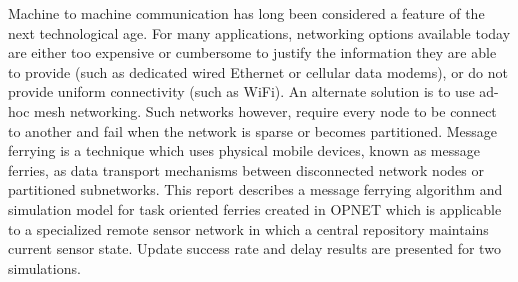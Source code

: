 Machine to machine communication has long been considered a feature of the next technological age. 
For many applications, networking options available today are either too expensive or cumbersome to justify the information they are able to provide (such as dedicated wired Ethernet or cellular data modems), or do not provide uniform connectivity (such as WiFi). 
An alternate solution is to use ad-hoc mesh networking. 
Such networks however, require every node to be connect to another and fail when the network is sparse or becomes partitioned.
Message ferrying is a technique which uses physical mobile devices, known as message ferries, as data transport mechanisms between disconnected network nodes or partitioned subnetworks.
This report describes a message ferrying algorithm and simulation model for task oriented ferries created in OPNET which is applicable to a specialized remote sensor network in which a central repository maintains current sensor state.
Update success rate and delay results are presented for two simulations.


